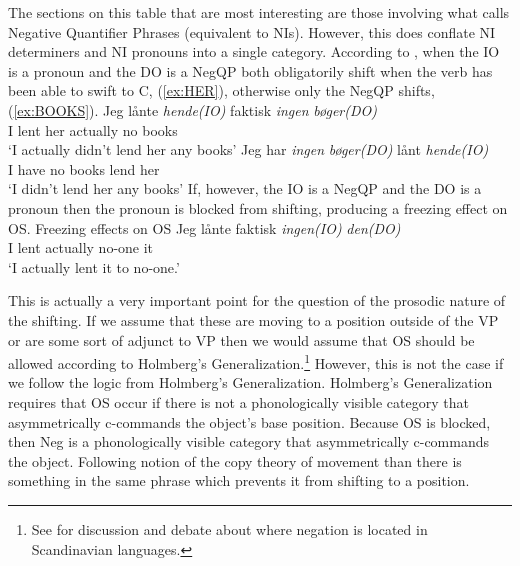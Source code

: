 \documentclass[12pt, letterpaper]{article}
\begin{document}
The sections on this table that are most interesting are those involving what \citeauthor{christensenInterfacesNegationSyntax2005} calls Negative Quantifier Phrases (equivalent to NIs). However, this does conflate NI determiners and NI pronouns into a single category. According to \citeauthor{christensenInterfacesNegationSyntax2005}, when the IO is a pronoun and the DO is a NegQP both obligatorily shift when the verb has been able to swift to C, (\ref{ex:HER}), otherwise only the NegQP shifts, (\ref{ex:BOOKS}).
	\ea 
		\ea \label{ex:HER}
		\gll Jeg lånte \textit{hende(IO)} faktisk \textit{ingen} \textit{bøger(DO)}\\
		I lent her actually no books\\
		\glt `I actually didn't lend her any books'
		\ex \label{ex:BOOKS}
		\gll Jeg har \textit{ingen} \textit{bøger(DO)} lånt \textit{hende(IO)}\\
		I have no books lend her\\
		\glt `I didn't lend her any books'
		\z 
	\z 
If, however, the IO is a NegQP and the DO is a pronoun then the pronoun is blocked from shifting, producing a freezing effect on OS.
	\ea Freezing effects on OS
		\ea 
		\gll Jeg lånte faktisk \textit{ingen(IO)} \textit{den(DO)}\\
		I lent actually no-one it\\
		\glt `I actually lent it to no-one.'
		\z 
	\z

This is actually a very important point for the question of the prosodic nature of the shifting. If we assume that these are moving to a position outside of the VP or are some sort of adjunct to VP then we would assume that OS should be allowed according to Holmberg's Generalization.\footnote{See \citet{thrainssonSyntaxIcelandic2010} for discussion and debate about where negation is located in Scandinavian languages.} However, this is not the case if we follow the logic from Holmberg's Generalization. Holmberg's Generalization requires that OS occur if there is not a phonologically visible category that asymmetrically c-commands the object's base position. Because OS is blocked, then Neg is a phonologically visible category that asymmetrically c-commands the object. Following \citet{chomskyMinimalistProgramLinguistic1993,chomskyMinimalistProgram1995} notion of the copy theory of movement than there is something in the same phrase which prevents it from shifting to a position. 
\end{document}
